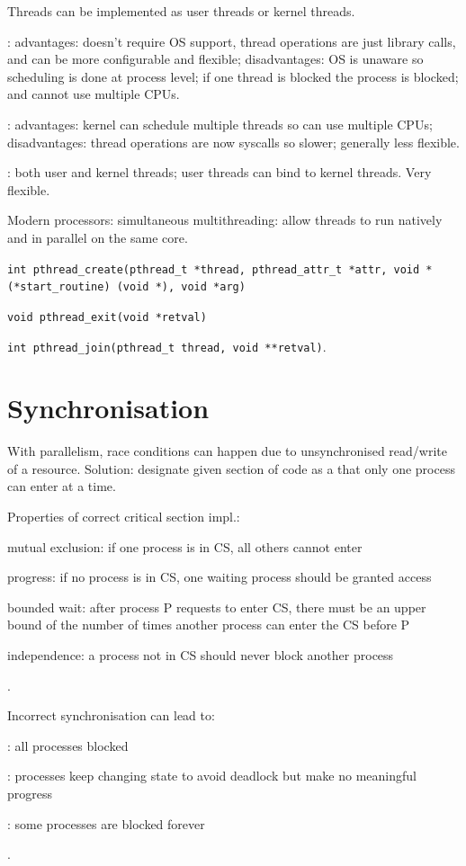 \documentclass[fontsize=9pt,twoside]{slnotes}
\begin{document}
Threads can be implemented as user threads or kernel threads.

: advantages: doesn't require OS support, thread operations are just library calls, and can be more configurable and flexible; disadvantages: OS is unaware so scheduling is done at process level; if one thread is blocked the process is blocked; and cannot use multiple CPUs.

: advantages: kernel can schedule multiple threads so can use multiple CPUs; disadvantages: thread operations are now syscalls so slower; generally less flexible.

: both user and kernel threads; user threads can bind to kernel threads. Very flexible.

Modern processors: simultaneous multithreading: allow threads to run natively and in parallel on the same core.

\texttt{int pthread\_create(pthread\_t *thread, pthread\_attr\_t *attr, void *(*start\_routine) (void *), void *arg)}

\texttt{void pthread\_exit(void *retval)}

\texttt{int pthread\_join(pthread\_t thread, void **retval)}.

\chapter{Synchronisation}
With parallelism, race conditions can happen due to unsynchronised read/write of a resource. Solution: designate given section of code as a  that only one process can enter at a time.

Properties of correct critical section impl.: \begin{slinenum}
\item mutual exclusion: if one process is in CS, all others cannot enter
\item progress: if no process is in CS, one waiting process should be granted access
\item bounded wait: after process P requests to enter CS, there must be an upper bound of the number of times another process can enter the CS before P
\item independence: a process not in CS should never block another process
\end{slinenum}.

Incorrect synchronisation can lead to: \begin{slinenumor}
\item {}: all processes blocked
\item {}: processes keep changing state to avoid deadlock but make no meaningful progress
\item {}: some processes are blocked forever
\end{slinenumor}.
\end{document}
